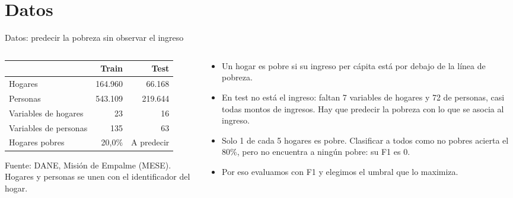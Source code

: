 \documentclass[aspectratio=169, 10pt]{beamer}
\begin{document}
\section{Datos}

\begin{frame}{Datos: predecir la pobreza sin observar el ingreso}
  \begin{columns}[c, onlytextwidth]
    \begin{column}{0.5\textwidth}
      \centering
      \small
      \begin{tabular}{lrr}
        \toprule
        & Train & Test \\
        \midrule
        Hogares & 164.960 & 66.168 \\
        Personas & 543.109 & 219.644 \\
        Variables de hogares & 23 & 16 \\
        Variables de personas & 135 & 63 \\
        Hogares pobres & 20,0\% & A predecir \\
        \bottomrule
      \end{tabular}

      \vspace{2mm}
      {\scriptsize Fuente: DANE, Misi\'on de Empalme (MESE). Hogares y personas se unen con el identificador del hogar.}
    \end{column}
    \begin{column}{0.46\textwidth}
      \footnotesize
      \begin{itemize}
        \item Un hogar es pobre si su ingreso per c\'apita est\'a por debajo de la l\'inea de pobreza.
        \item En test no est\'a el ingreso: faltan 7 variables de hogares y 72 de personas, casi todas montos de ingresos. Hay que predecir la pobreza con lo que se asocia al ingreso.
        \item Solo 1 de cada 5 hogares es pobre. Clasificar a todos como no pobres acierta el 80\%, pero no encuentra a ning\'un pobre: su F1 es 0.
        \item Por eso evaluamos con F1 y elegimos el umbral que lo maximiza.
      \end{itemize}
    \end{column}
  \end{columns}
\end{frame}
\end{document}
